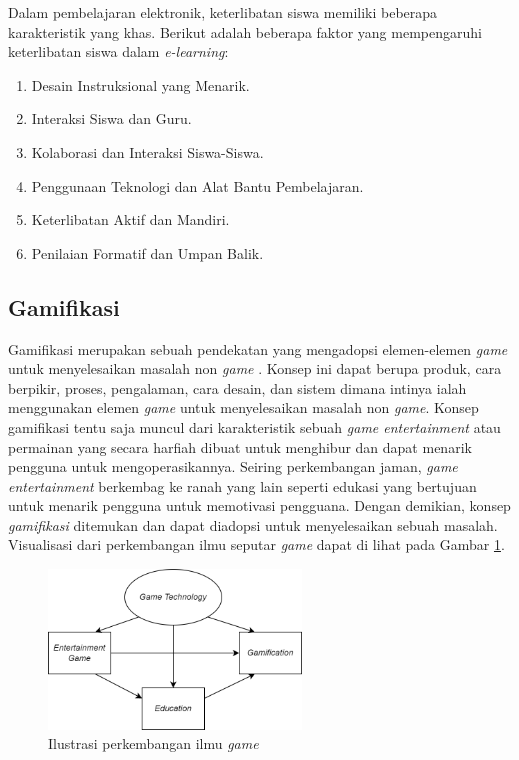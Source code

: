 Dalam pembelajaran elektronik, keterlibatan siswa memiliki beberapa karakteristik yang khas. Berikut adalah beberapa faktor yang mempengaruhi keterlibatan siswa dalam \textit{e-learning}:
\begin{enumerate}
	\item Desain Instruksional yang Menarik.
	\item Interaksi Siswa dan Guru.
	\item Kolaborasi dan Interaksi Siswa-Siswa.
	\item Penggunaan Teknologi dan Alat Bantu Pembelajaran.
	\item Keterlibatan Aktif dan Mandiri.
	\item Penilaian Formatif dan Umpan Balik.
\end{enumerate}
\subsection{Gamifikasi}
Gamifikasi merupakan sebuah pendekatan yang mengadopsi elemen-elemen \textit{game} untuk menyelesaikan masalah non \textit{game} \cite{marisa2020gamifikasi}.
Konsep ini dapat berupa produk, cara berpikir, proses, pengalaman, cara desain, dan sistem dimana intinya ialah menggunakan elemen \textit{game} untuk menyelesaikan masalah non \textit{game}. 
Konsep gamifikasi tentu saja muncul dari karakteristik sebuah \textit{game entertainment} atau permainan yang secara harfiah dibuat untuk menghibur dan dapat menarik pengguna untuk mengoperasikannya.
Seiring perkembangan jaman, \textit{game entertainment} berkembag ke ranah yang lain seperti edukasi yang bertujuan untuk menarik pengguna untuk memotivasi pengguana.
Dengan demikian, konsep \textit{gamifikasi} ditemukan dan dapat diadopsi untuk menyelesaikan sebuah masalah. Visualisasi dari perkembangan ilmu seputar \textit{game} dapat di lihat pada Gambar \ref*{Fig:Ilustrasi perkembangan ilmu game}.
\begin{figure}[H]
	\centering
	\includegraphics[width=0.6\textwidth]{contents/chapter-2/images/perkembangan-game.png}
	\caption{Ilustrasi perkembangan ilmu \textit{game} \cite{2004activity}}
	\label{Fig:Ilustrasi perkembangan ilmu game}
\end{figure}
